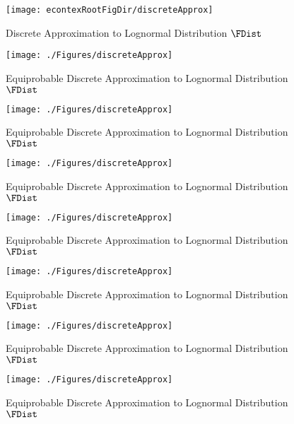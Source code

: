 \begin{figure}
        \texttt{[image: econtexRootFigDir/discreteApprox]}
        \caption{Discrete Approximation to Lognormal Distribution $\FDist$}
        \label{fig:discreteapprox}
\end{figure}
  \hypertarget{discreteApprox}{}
  \begin{figure}
    \texttt{[image: ./Figures/discreteApprox]}
    \caption{Equiprobable Discrete Approximation to Lognormal Distribution $\FDist$}
    \label{fig:discreteapprox}
  \end{figure}
  \hypertarget{discreteApprox}{}
  \begin{figure}
    \texttt{[image: ./Figures/discreteApprox]}
    \caption{Equiprobable Discrete Approximation to Lognormal Distribution $\FDist$}
    \label{fig:discreteapprox}
  \end{figure}
  \hypertarget{discreteApprox}{}
  \begin{figure}
    \texttt{[image: ./Figures/discreteApprox]}
    \caption{Equiprobable Discrete Approximation to Lognormal Distribution $\FDist$}
    \label{fig:discreteapprox}
  \end{figure}
  \hypertarget{discreteApprox}{}
  \begin{figure}
    \texttt{[image: ./Figures/discreteApprox]}
    \caption{Equiprobable Discrete Approximation to Lognormal Distribution $\FDist$}
    \label{fig:discreteapprox}
  \end{figure}
  \hypertarget{discreteApprox}{}
  \begin{figure}
    \texttt{[image: ./Figures/discreteApprox]}
    \caption{Equiprobable Discrete Approximation to Lognormal Distribution $\FDist$}
    \label{fig:discreteapprox}
  \end{figure}
  \hypertarget{discreteApprox}{}
  \begin{figure}
    \texttt{[image: ./Figures/discreteApprox]}
    \caption{Equiprobable Discrete Approximation to Lognormal Distribution $\FDist$}
    \label{fig:discreteapprox}
  \end{figure}
  \hypertarget{discreteApprox}{}
  \begin{figure}
    \texttt{[image: ./Figures/discreteApprox]}
    \caption{Equiprobable Discrete Approximation to Lognormal Distribution $\FDist$}
    \label{fig:discreteapprox}
  \end{figure}
  \hypertarget{discreteApprox}{}
